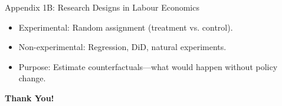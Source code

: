 \documentclass[aspectratio=169]{beamer}
\begin{document}
\begin{frame}{Appendix 1B: Research Designs in Labour Economics}
\begin{itemize}[<+->]
  \item Experimental: Random assignment (treatment vs. control).
  \item Non-experimental: Regression, DiD, natural experiments.
  \item Purpose: Estimate counterfactuals—what would happen without policy change.
\end{itemize}
\end{frame}

\begin{frame}
\centering
\Huge{\textbf{Thank You!}} \\

\end{frame}
\end{document}
